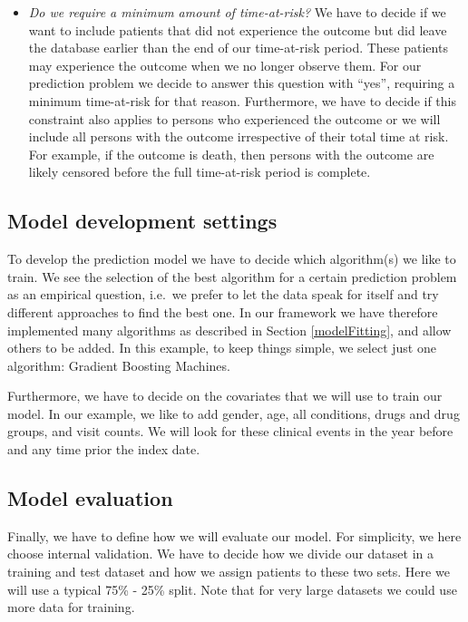 \documentclass[11pt]{book}
\theoremstyle{definition}
\theoremstyle{definition}
\theoremstyle{definition}
\theoremstyle{remark}
\begin{document}
\begin{itemize}
\item
  \emph{Do we require a minimum amount of time-at-risk?} We have to decide if we want to include patients that did not experience the outcome but did leave the database earlier than the end of our time-at-risk period. These patients may experience the outcome when we no longer observe them. For our prediction problem we decide to answer this question with ``yes'', requiring a minimum time-at-risk for that reason. Furthermore, we have to decide if this constraint also applies to persons who experienced the outcome or we will include all persons with the outcome irrespective of their total time at risk. For example, if the outcome is death, then persons with the outcome are likely censored before the full time-at-risk period is complete.
\end{itemize}

\hypertarget{model-development-settings}{%
\subsection{Model development settings}\label{model-development-settings}}

To develop the prediction model we have to decide which algorithm(s) we like to train. We see the selection of the best algorithm for a certain prediction problem as an empirical question, i.e.~we prefer to let the data speak for itself and try different approaches to find the best one. In our framework we have therefore implemented many algorithms as described in Section \ref{modelFitting}, and allow others to be added. In this example, to keep things simple, we select just one algorithm: Gradient Boosting Machines.

Furthermore, we have to decide on the covariates that we will use to train our model. In our example, we like to add gender, age, all conditions, drugs and drug groups, and visit counts. We will look for these clinical events in the year before and any time prior the index date.

\hypertarget{model-evaluation}{%
\subsection{Model evaluation}\label{model-evaluation}}

Finally, we have to define how we will evaluate our model. For simplicity, we here choose internal validation. We have to decide how we divide our dataset in a training and test dataset and how we assign patients to these two sets. Here we will use a typical 75\% - 25\% split. Note that for very large datasets we could use more data for training.
\end{document}
